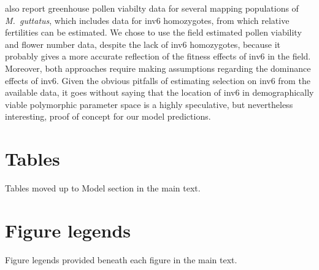 \documentclass[11pt]{article}
\begin{document}
\citet{LeeKelly2015} also report greenhouse pollen viabilty data for several mapping populations of {\itshape M.~guttatus}, which includes data for inv6 homozygotes, from which relative fertilities can be estimated. We chose to use the field estimated pollen viability and flower number data, despite the lack of inv6 homozygotes, because it probably gives a more accurate reflection of the fitness effects of inv6 in the field. Moreover, both approaches require making assumptions regarding the dominance effects of inv6. Given the obvious pitfalls of estimating selection on inv6 from the available data, it goes without saying that the location of inv6 in demographically viable polymorphic parameter space is a highly speculative, but nevertheless interesting, proof of concept for our model predictions.



%
%
\newpage{}





\section{Tables}
\renewcommand{\thetable}{\arabic{table}}
\setcounter{table}{0}

Tables moved up to Model section in the main text.

\section{Figure legends}

Figure legends provided beneath each figure in the main text.

\end{document}
